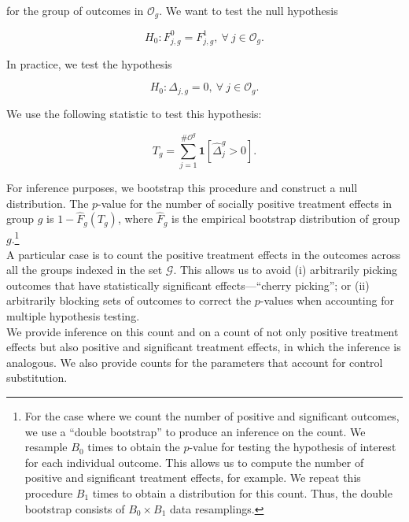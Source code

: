 \noindent for the group of outcomes in $\mathcal{O}_{g}$. We want to test the null hypothesis 


\begin{equation}
H_{0} : F_{j,g}^0 = F_{j,g}^1, \ \forall \ j \in \mathcal{O}_{g}. 
\end{equation}

\noindent In practice, we test the hypothesis  

\begin{equation}
H_{0} : \Delta_{j,g} = 0, \ \forall \ j \in \mathcal{O}_{g}. 
\end{equation}

\noindent We use the following statistic to test this hypothesis: 

\begin{equation}
T_{g} = \sum _{j=1}^{\# \mathcal{O}^g} \mathbf{1} \left[ \widehat{\Delta}_{j}^{g} > 0\right]. \label{eq:count}
\end{equation} 

\noindent For inference purposes, we bootstrap this procedure and construct a null distribution. The $p$-value for the number of socially positive treatment effects in group $g$ is $1 - \widehat{F}_{g} \left( T_{g} \right)$, where $ \widehat{F}_{g}$ is the empirical bootstrap distribution of group $g$.\footnote{For the case where we count the number of positive and significant outcomes, we use a ``double bootstrap'' to produce an inference on the count. We resample $B_{0}$ times to obtain the $p$-value for testing the hypothesis of interest for each individual outcome. This allows us to compute the number of positive and significant treatment effects, for example. We repeat this procedure $B_{1}$ times to obtain a distribution for this count. Thus, the double bootstrap consists of $B_{0} \times B_{1}$ data resamplings.}\\

\noindent A particular case is to count the positive treatment effects in the outcomes across all the groups indexed in the set $\mathcal{G}$. This allows us to avoid (i) arbitrarily picking outcomes that have statistically significant effects---``cherry picking''; or (ii) arbitrarily blocking sets of outcomes to correct the $p$-values when accounting for multiple hypothesis testing.\\

\noindent We provide inference on this count and on a count of not only positive treatment effects but also positive and significant treatment effects, in which the inference is analogous. We also provide counts for the parameters that account for control substitution.

